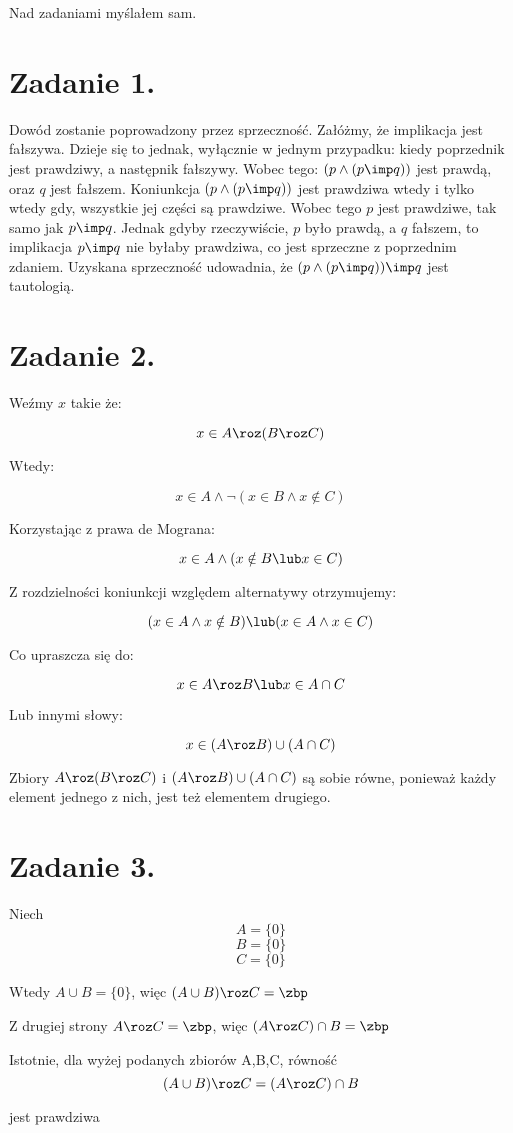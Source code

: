 \documentclass{article}
\begin{document}
 
 
 
 



\maketitle
Nad zadaniami myślałem sam.
\section*{Zadanie 1.}
Dowód zostanie poprowadzony przez sprzeczność. Załóżmy, że implikacja jest fałszywa. Dzieje się to jednak, wyłącznie w jednym przypadku: kiedy poprzednik jest prawdziwy, a następnik fałszywy. Wobec tego: $(p \wedge ( p \imp q ))$ jest prawdą, oraz $q$ jest fałszem. Koniunkcja $(p \wedge ( p \imp q ))$ jest prawdziwa wtedy i tylko wtedy gdy, wszystkie jej części są prawdziwe. Wobec tego $p$ jest prawdziwe, tak samo jak $p\imp q$. Jednak gdyby rzeczywiście, $p$ było prawdą, a $q$ fałszem, to implikacja $ p \imp q $ nie byłaby prawdziwa, co jest sprzeczne z poprzednim zdaniem. Uzyskana sprzeczność udowadnia, że $(p \wedge ( p \imp q )) \imp q $ jest tautologią. \blacksquare
\section*{Zadanie 2.}
Weźmy $x$ takie że:

\[ x \in A \roz(B\roz C)\]

Wtedy: 

\[ x \in A  \wedge \lnot ( x \in B \wedge x \notin C) \]

Korzystając z prawa de Mograna:

\[ x \in A  \wedge ( x \notin B \lub x \in C) \]

Z rozdzielności koniunkcji względem alternatywy otrzymujemy:

\[(x \in A \wedge x \notin B) \lub (x\in A \wedge x \in C)\]

Co upraszcza się do:

\[x \in A \roz B \lub x \in A \cap C\]

Lub innymi słowy:

\[x \in (A \roz B) \cup (A \cap C)\]

Zbiory $A  \roz ( B \roz C)$ i $ (A \roz B) \cup (A \cap C)$ są sobie równe, ponieważ każdy element jednego z nich, jest też elementem drugiego. \blacksquare

\section*{Zadanie 3.}

Niech \[A = \{0\}\]
\[B=\{0\}\]
\[C= \{0\}\]

Wtedy $ A \cup B = \{0\}$, więc $(A\cup B)\roz C = \zbp$

Z drugiej strony $A \roz C = \zbp$, więc  $(A \roz C)\cap B = \zbp$

Istotnie, dla wyżej podanych zbiorów A,B,C, równość \[ (A\cup B)\roz C = (A\roz C)\cap B\] 

jest prawdziwa
\end{document}
